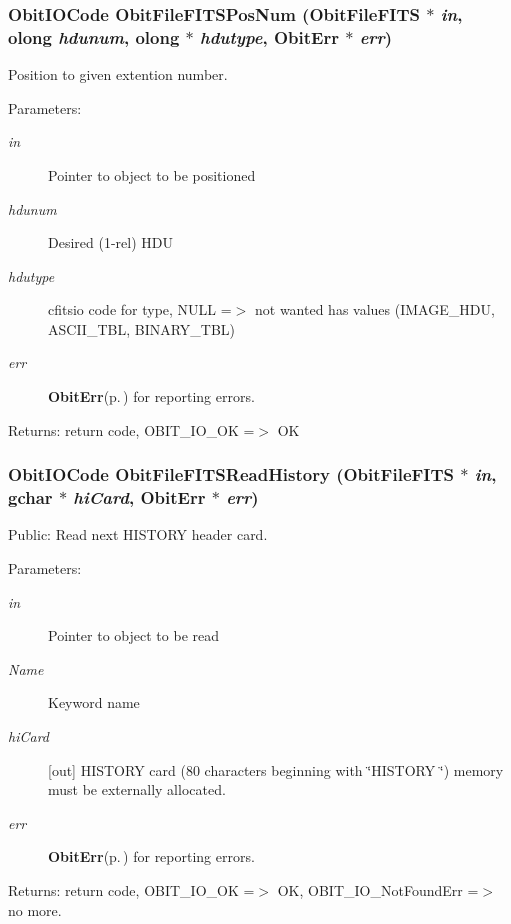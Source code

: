 \subsubsection{\setlength{\rightskip}{0pt plus 5cm}Obit\-IOCode Obit\-File\-FITSPos\-Num ({\bf Obit\-File\-FITS} $\ast$ {\em in}, {\bf olong} {\em hdunum}, {\bf olong} $\ast$ {\em hdutype}, {\bf Obit\-Err} $\ast$ {\em err})}\label{ObitFileFITS_8c_a15}


Position to given extention number. 

\begin{Desc}
\item[Parameters:]
\begin{description}
\item[{\em in}]Pointer to object to be positioned \item[{\em hdunum}]Desired (1-rel) HDU \item[{\em hdutype}]cfitsio code for type, NULL =$>$ not wanted has values (IMAGE\_\-HDU, ASCII\_\-TBL, BINARY\_\-TBL) \item[{\em err}]{\bf Obit\-Err}{\rm (p.\,\pageref{structObitErr})} for reporting errors. \end{description}
\end{Desc}
\begin{Desc}
\item[Returns:]return code, OBIT\_\-IO\_\-OK =$>$ OK \end{Desc}
\subsubsection{\setlength{\rightskip}{0pt plus 5cm}Obit\-IOCode Obit\-File\-FITSRead\-History ({\bf Obit\-File\-FITS} $\ast$ {\em in}, gchar $\ast$ {\em hi\-Card}, {\bf Obit\-Err} $\ast$ {\em err})}\label{ObitFileFITS_8c_a21}


Public: Read next HISTORY header card. 

\begin{Desc}
\item[Parameters:]
\begin{description}
\item[{\em in}]Pointer to object to be read \item[{\em Name}]Keyword name \item[{\em hi\-Card}][out] HISTORY card (80 characters beginning with \char`\"{}HISTORY \char`\"{}) memory must be externally allocated. \item[{\em err}]{\bf Obit\-Err}{\rm (p.\,\pageref{structObitErr})} for reporting errors. \end{description}
\end{Desc}
\begin{Desc}
\item[Returns:]return code, OBIT\_\-IO\_\-OK =$>$ OK, OBIT\_\-IO\_\-Not\-Found\-Err =$>$ no more. \end{Desc}
